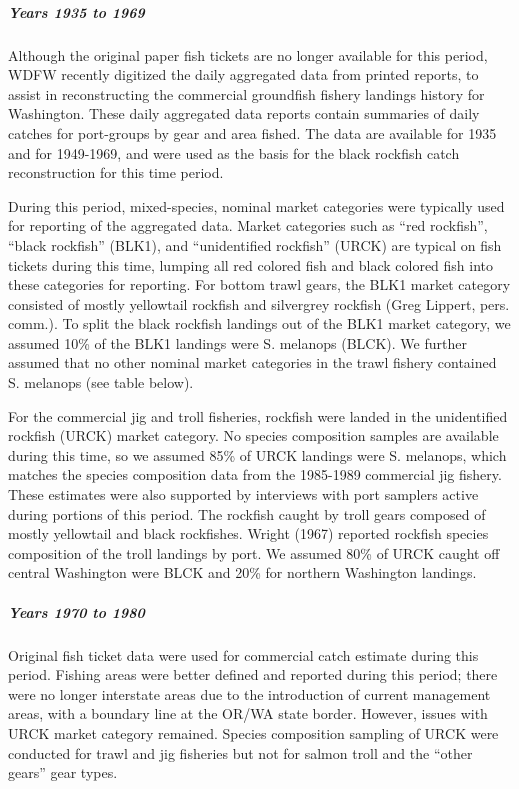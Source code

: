 \documentclass[11pt,
  english,
  letterpaper,
]{article}
\begin{document}
\hypertarget{years-1935-to-1969}{%
\subparagraph{Years 1935 to 1969}\label{years-1935-to-1969}}

Although the original paper fish tickets are no longer available for this period, WDFW recently digitized the daily aggregated data from printed reports, to assist in reconstructing the commercial groundfish fishery landings history for Washington. These daily aggregated data reports contain summaries of daily catches for port-groups by gear and area fished. The data are available for 1935 and for 1949-1969, and were used as the basis for the black rockfish catch reconstruction for this time period.

During this period, mixed-species, nominal market categories were typically used for reporting of the aggregated data. Market categories such as ``red rockfish'', ``black rockfish'' (BLK1), and ``unidentified rockfish'' (URCK) are typical on fish tickets during this time, lumping all red colored fish and black colored fish into these categories for reporting. For bottom trawl gears, the BLK1 market category consisted of mostly yellowtail rockfish and silvergrey rockfish (Greg Lippert, pers. comm.). To split the black rockfish landings out of the BLK1 market category, we assumed 10\% of the BLK1 landings were S. melanops (BLCK). We further assumed that no other nominal market categories in the trawl fishery contained S. melanops (see table below).

For the commercial jig and troll fisheries, rockfish were landed in the unidentified rockfish (URCK) market category. No species composition samples are available during this time, so we assumed 85\% of URCK landings were S. melanops, which matches the species composition data from the 1985-1989 commercial jig fishery. These estimates were also supported by interviews with port samplers active during portions of this period. The rockfish caught by troll gears composed of mostly yellowtail and black rockfishes. Wright (1967) reported rockfish species composition of the troll landings by port. We assumed 80\% of URCK caught off central Washington were BLCK and 20\% for northern Washington landings.

\hypertarget{years-1970-to-1980}{%
\subparagraph{Years 1970 to 1980}\label{years-1970-to-1980}}

Original fish ticket data were used for commercial catch estimate during this period. Fishing areas were better defined and reported during this period; there were no longer interstate areas due to the introduction of current management areas, with a boundary line at the OR/WA state border. However, issues with URCK market category remained. Species composition sampling of URCK were conducted for trawl and jig fisheries but not for salmon troll and the ``other gears'' gear types.
\end{document}
